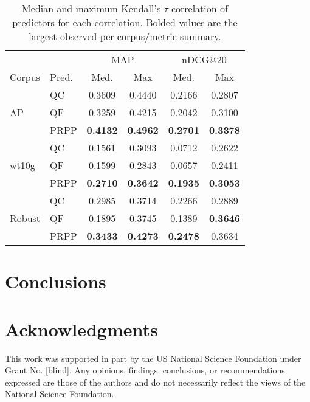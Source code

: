 \documentclass{sig-alternate}
\begin{document}
\begin{table}
\begin{tabular}{|l|l|c|c|c|c|} \hline
& & \multicolumn{2}{c|}{MAP} & \multicolumn{2}{c|}{nDCG@20} \\ \cline{3-6}
Corpus & Pred. & Med. & Max & Med. & Max \\ \hline\hline
\multirow{3}{*}{AP} & QC & 0.3609 & 0.4440 & 0.2166 & 0.2807 \\ \cline{2-6}
& QF & 0.3259 & 0.4215 & 0.2042 & 0.3100 \\ \cline{2-6}
& PRPP & \textbf{0.4132} & \textbf{0.4962} & \textbf{0.2701} & \textbf{0.3378} \\ \hline\hline
\multirow{3}{*}{wt10g} & QC & 0.1561 & 0.3093 & 0.0712 & 0.2622 \\ \cline{2-6}
& QF & 0.1599 & 0.2843 & 0.0657 & 0.2411 \\ \cline{2-6}
& PRPP & \textbf{0.2710} & \textbf{0.3642} & \textbf{0.1935} & \textbf{0.3053} \\ \hline\hline
\multirow{3}{*}{Robust} & QC & 0.2985 & 0.3714 & 0.2266 & 0.2889 \\ \cline{2-6}
& QF & 0.1895 & 0.3745 & 0.1389 & \textbf{0.3646} \\ \cline{2-6}
& PRPP & \textbf{0.3433} & \textbf{0.4273} & \textbf{0.2478} & 0.3634 \\ \hline
\end{tabular}
\caption{Median and maximum Kendall's $\tau$ correlation of predictors for each correlation. Bolded values are the largest observed per corpus/metric summary.}
\label{table.results.self.kendall}
\end{table}



\section{Conclusions}\label{section.conclusions}

\section{Acknowledgments}\label{section.acknowledgments}

This work was supported in part by the US National Science Foundation under Grant No. [blind]. Any opinions, findings, conclusions, or recommendations expressed are those of the authors and do not necessarily reflect the views of the National Science Foundation.


  
\end{document}
